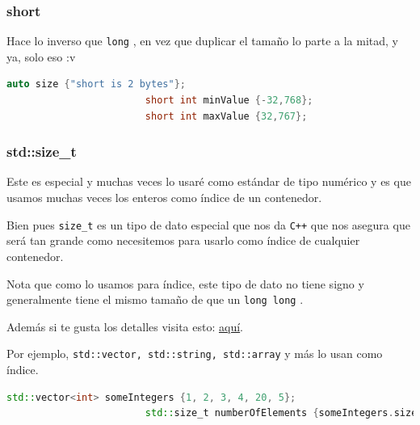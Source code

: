 \documentclass[12pt, fleqn]{report}                             %
\theoremstyle{break}                                            %
\newcommand{\textCode}[1]  { \texttt{#1} }                      %
\newcommand{\Cpp}{\ignorespaces\textCode{C++}}                  %
\begin{document}
                \subsubsection{short}

                    Hace lo inverso que \textCode{long}, en vez que duplicar el tamaño lo parte a la mitad,
                    y ya, solo eso :v

                    \begin{lstlisting}[language=C++, gobble=24]
                        auto size {"short is 2 bytes"};
                        short int minValue {-32,768};
                        short int maxValue {32,767};
                    \end{lstlisting}
                
                \subsubsection{std::size\_t}

                    Este es especial y muchas veces lo usaré como estándar de tipo numérico
                    y es que usamos muchas veces los enteros como índice de un contenedor.

                    Bien pues \textCode{size\_t} es un tipo de dato especial que nos da \Cpp
                    que nos asegura que será tan grande como necesitemos para usarlo como índice
                    de cualquier contenedor.

                    Nota que como lo usamos para índice, este tipo de dato no tiene signo y generalmente tiene
                    el mismo tamaño de que un \textCode{long long}.

                    Además si te gusta los detalles visita esto:
                    \underline{\href{https://stackoverflow.com/questions/4849678/c-for-loop-size-type-vs-size-t}{aquí}}.

                    Por ejemplo, \textCode{std::vector, std::string, std::array} y más lo usan
                    como índice.
                    \begin{lstlisting}[language=C++, gobble=24]
                        std::vector<int> someIntegers {1, 2, 3, 4, 20, 5};
                        std::size_t numberOfElements {someIntegers.size()}; 
                    \end{lstlisting}
\end{document}
